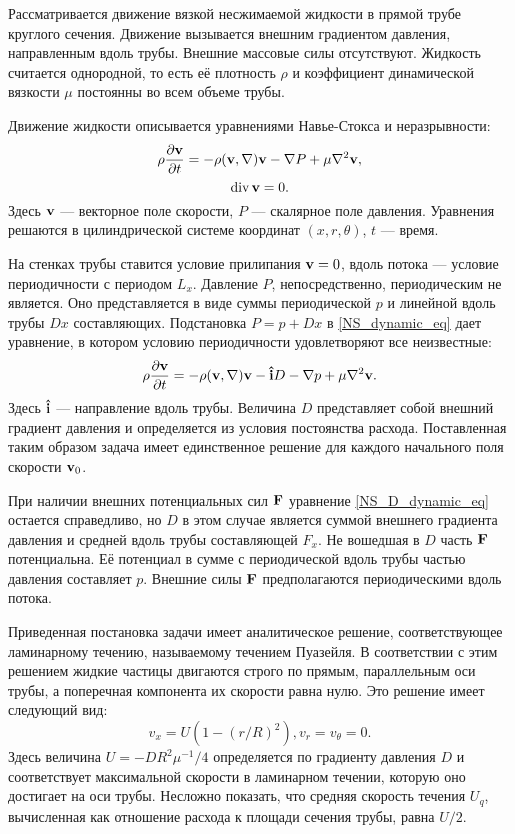 
Рассматривается движение вязкой несжимаемой жидкости в прямой трубе круглого сечения. Движение вызывается внешним градиентом давления, направленным вдоль трубы. Внешние массовые силы отсутствуют. Жидкость считается однородной, то есть её плотность $\rho$ и коэффициент динамической вязкости $\mu$ постоянны во всем объеме трубы. 


Движение жидкости описывается уравнениями Навье-Стокса и неразрывности:
\begin{equation}\label{NS_dynamic_eq}
\rho\frac{\partial \mathbf{v}}{\partial t} = - \rho (\mathbf{v}, \nabla) \mathbf{v} - \nabla P + \mu \nabla^2 \mathbf{v},
\end{equation}
\begin{equation}\label{incompres_eq}
\operatorname{div} \mathbf{v} = 0. 
\end{equation}
Здесь $\mathbf{v}$ --- векторное поле скорости, $P$ ---  скалярное поле давления. Уравнения решаются в цилиндрической системе координат $(x,r,\theta)$, $t$ --- время.


На стенках трубы ставится условие прилипания $\mathbf{v} = 0$, вдоль потока --- условие периодичности с периодом $L_x$. Давление $P$, непосредственно, периодическим не является. Оно представляется в виде суммы периодической $p$ и линейной вдоль трубы $Dx$ составляющих. Подстановка $P = p + Dx$ в \eqref{NS_dynamic_eq} дает уравнение, в котором условию периодичности удовлетворяют все неизвестные:
\begin{equation}\label{NS_D_dynamic_eq}
\rho \frac{\partial \mathbf{v}}{\partial t} =  - \rho (\mathbf{v}, \nabla) \mathbf{v} - \mathbf{\hat{i}} D - \nabla p + \mu \nabla^2 \mathbf{v}.
\end{equation}
Здесь $\mathbf{\hat{i}}$ --- направление вдоль трубы. Величина $D$ представляет собой внешний градиент давления и определяется из условия постоянства расхода. Поставленная таким образом задача имеет единственное решение для каждого начального поля скорости $\mathbf{v}_0$. 


При наличии внешних потенциальных сил $\mathbf{F}$ уравнение \eqref{NS_D_dynamic_eq} остается справедливо, но $D$ в этом случае является суммой внешнего градиента давления и средней вдоль трубы составляющей $F_x$. Не вошедшая в $D$ часть $\mathbf{F}$ потенциальна. Её потенциал в сумме с периодической вдоль трубы частью давления составляет $p$. Внешние силы $\mathbf{F}$ предполагаются периодическими вдоль потока.


Приведенная постановка задачи имеет аналитическое решение, соответствующее ламинарному течению, называемому течением Пуазейля. В соответствии с этим решением жидкие частицы двигаются строго по прямым, параллельным оси трубы, а поперечная компонента их скорости равна нулю. Это решение имеет следующий вид:
\begin{equation}
v_x = U (1 - (r / R)^2), 
v_r = v_\theta = 0. 
\end{equation}
Здесь величина $U = - D R^2\mu^{-1}/4 $ определяется по градиенту давления $D$ и соответствует максимальной скорости в ламинарном течении, которую оно достигает на оси трубы. Несложно показать, что средняя скорость течения $U_q$, вычисленная как отношение расхода к площади сечения трубы, равна $U/2$. 


